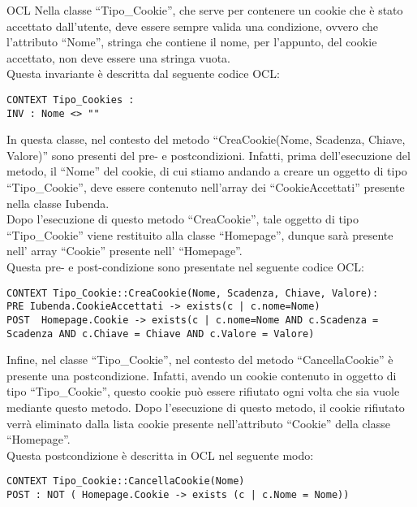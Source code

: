 \begin{listaPersonale}{OCL}
    Nella classe “Tipo\_Cookie”, che serve per contenere un cookie che è stato accettato dall’utente, deve essere sempre valida una condizione, ovvero che l’attributo “Nome”, stringa che contiene il nome, per l’appunto, del cookie accettato, non deve essere una stringa vuota.\\   
    Questa invariante è descritta dal seguente codice OCL:
    \begin{lstlisting}
CONTEXT Tipo_Cookies :
INV : Nome <> "" 
    \end{lstlisting}
    In questa classe, nel contesto del metodo “CreaCookie(Nome, Scadenza, Chiave, Valore)” sono presenti del pre- e postcondizioni. Infatti, prima dell’esecuzione del metodo, il “Nome” del cookie, di cui stiamo andando a creare un oggetto di tipo “Tipo\_Cookie”, deve essere contenuto nell’array dei “CookieAccettati” presente nella classe Iubenda.\\
    Dopo l’esecuzione di questo metodo “CreaCookie”, tale oggetto di tipo “Tipo\_Cookie” viene restituito alla classe “Homepage”, dunque sarà presente nell’ array “Cookie” presente nell’ 
    “Homepage”.\\
    Questa pre- e post-condizione sono presentate nel seguente codice OCL:
    \begin{lstlisting}
CONTEXT Tipo_Cookie::CreaCookie(Nome, Scadenza, Chiave, Valore):
PRE Iubenda.CookieAccettati -> exists(c | c.nome=Nome)
POST  Homepage.Cookie -> exists(c | c.nome=Nome AND c.Scadenza =  Scadenza AND c.Chiave = Chiave AND c.Valore = Valore) 
    \end{lstlisting}
    Infine, nel classe “Tipo\_Cookie”, nel contesto del metodo “CancellaCookie” è presente una postcondizione. Infatti, avendo un cookie contenuto in oggetto di tipo “Tipo\_Cookie”, questo cookie può essere rifiutato ogni volta che sia vuole mediante questo metodo. Dopo l’esecuzione di questo metodo, il cookie rifiutato verrà eliminato dalla lista cookie presente nell’attributo “Cookie” della classe “Homepage”.\\
    Questa postcondizione è descritta in OCL nel seguente modo:

    \begin{lstlisting}
CONTEXT Tipo_Cookie::CancellaCookie(Nome)
POST : NOT ( Homepage.Cookie -> exists (c | c.Nome = Nome))
    \end{lstlisting}


\end{listaPersonale}
